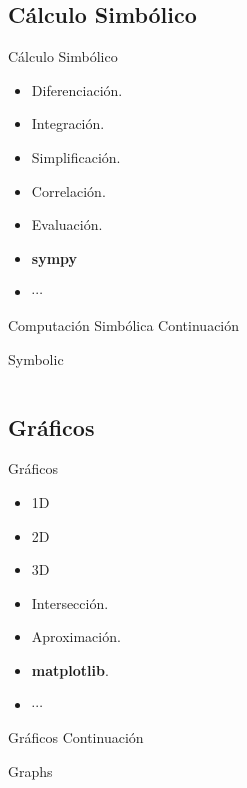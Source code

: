 \documentclass[usenames, dvipsnames, compress]{beamer}
\begin{document}
		\subsection{Cálculo Simbólico}
		\begin{frame}{Cálculo Simbólico}
		\begin{itemize}[<+- | alert@ +>]
			\item Diferenciación.
			\item Integración.
			\item Simplificación.
			\item Correlación.
			\item Evaluación.
			\item \textbf{sympy}
			\item $\cdots$
		\end{itemize}
		\end{frame}
		\begin{frame}{Computación Simbólica Continuación}
		\begin{block}{Symbolic}
		\inputminted[xleftmargin=\parindent,linenos]{python}{codes/symbolic_computation.py}
		\end{block}
		\end{frame}
		\subsection{Gráficos}
		\begin{frame}{Gráficos}
		\begin{itemize}[<+- | alert@ +>]
			\item 1D
			\item 2D
			\item 3D
			\item Intersección.
			\item Aproximación.
			\item \textbf{matplotlib}.
			\item $\cdots$
		\end{itemize}
	\end{frame}
	\begin{frame}{Gráficos Continuación}
	\begin{block}{Graphs}
	\inputminted[xleftmargin=\parindent,linenos]{python}{codes/graphs.py}
	\end{block}
	\end{frame}
\end{document}
